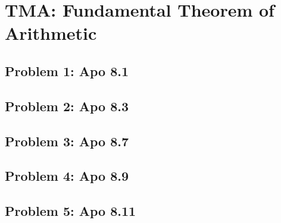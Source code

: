 \section{TMA: Fundamental Theorem of Arithmetic}

\subsection[Problem 1]{Problem 1: Apo 8.1}

\subsection[Problem 2]{Problem 2: Apo 8.3}

\subsection[Problem 3]{Problem 3: Apo 8.7}

\subsection[Problem 4]{Problem 4: Apo 8.9}

\subsection[Problem 5]{Problem 5: Apo 8.11}